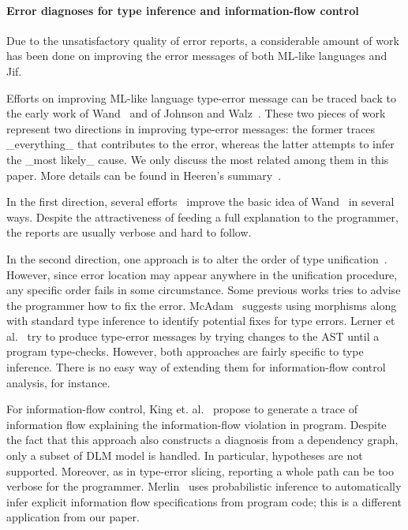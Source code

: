 \paragraph{Error diagnoses for type inference
	    and information-flow control} 

Due to the unsatisfactory quality of error reports, a considerable
amount of work has been done on improving the error messages of both
ML-like languages and Jif.

Efforts on improving ML-like language type-error message can be
traced back to the early work of Wand~\cite{wand-errorfinding} and
of Johnson and Walz~\cite{johnson-popl86}. These two pieces of work
represent two directions in improving type-error messages: the former
traces _everything_ that contributes to the error, whereas the
latter attempts to infer the _most likely_ cause. We only discuss the
most related among them in this paper. More details can be found in
Heeren's summary~\cite{heeren:thesis}.

In the first direction, several efforts~\cite{choppella95,
haack:slicing, tip:slicing} improve the basic idea of
Wand~\cite{wand-errorfinding} in several ways. Despite the
attractiveness of feeding a full explanation to the programmer, the
reports are usually verbose and hard to follow.

In the second direction, one approach is to alter the order of type
unification~\cite{lee:toplas, mcadam:unification}. However, since
error location may appear anywhere in the unification procedure, any
specific order fails in some circumstance. Some previous works tries
to advise the programmer how to fix the error.
McAdam~\cite{mcadam:thesis} suggests using morphisms along with
standard type inference to identify potential fixes for type errors.
Lerner et al.~\cite{lerner:pldi07} try to produce type-error messages
by trying changes to the AST until a program type-checks.  However,
both approaches are fairly specific to type inference. There is no
easy way of extending them for information-flow control analysis, for
instance.

For information-flow control, King et. al.~\cite{king:fse} propose to
generate a trace of information flow explaining the information-flow
violation in program. Despite the fact that this approach also
constructs a diagnosis from a dependency graph, only a subset of DLM
model is handled. In particular, hypotheses are not supported.
Moreover, as in type-error slicing, reporting a whole path can be
too verbose for the programmer.  Merlin~\cite{livshits:merlin} uses
probabilistic inference to automatically infer explicit information
flow specifications from program code; this is a different
application from our paper.

